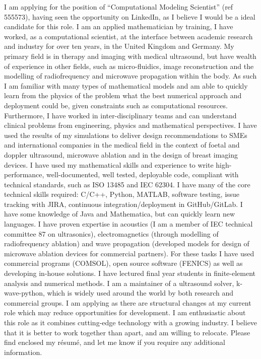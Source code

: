 \documentclass[11pt, a4paper, sans]{moderncv}
\begin{document}
%

%
\vfill
%
I am applying for the position of \enquote{Computational Modeling Scientist} (ref 555573), having seen the opportunity on LinkedIn, as I believe I would be a ideal candidate for this role. 
%
\vfill
%
I am an applied mathematician by training, I have worked, as a computational scientist, at the interface between academic research and industry for over ten years, in the United Kingdom and Germany. My  primary field is in therapy and imaging with medical ultrasound, but have wealth of experience in other fields, such as micro-fluidics, image reconstruction and the modelling of radiofrequency and microwave propagation within the body. As such I am familiar with many types of mathematical models and am able to quickly learn from the physics of the problem what the best numerical approach and deployment could be, given constraints such as computational resources.
%
\vfill
%
Furthermore, I have worked in inter-disciplinary teams and can understand clinical problems from engineering, physics and mathematical perspectives. I have used the results of my simulations to deliver design recommendations to SMEs and international companies in the medical field in the context of foetal and doppler ultrasound, microwave ablation and in the design of breast imaging devices. 
%
\vfill
%
I have used my mathematical skills and experience to write high-performance, well-documented, well tested, deployable code, compliant with technical standards, such as ISO 13485 and IEC 62304. I have many of the core technical skills required: C/C++, Python, MATLAB, software testing, issue tracking with JIRA, continuous integration/deployment in GitHub/GitLab. I have some knowledge of Java and Mathematica, but can quickly learn new languages.
%
\vfill
%
I have proven expertise in acoustics (I am a member of IEC technical committee 87 on ultrasonics), electromagnetics (through modelling of radiofrequency ablation) and wave propagation (developed models for design of microwave ablation devices for commercial partners). For these tasks I have used commercial programs (COMSOL), open source software (FENICS) as well as developing in-house solutions. I have lectured final year students in finite-element analysis and numerical methods. I am a maintainer of a ultrasound solver, k-wave-python, which is widely used around the world by both research and commercial groups. 
%
\vfill
%
I am applying as there are structural changes at my current role which may reduce opportunities for development. I am enthusiastic about this role as it combines cutting-edge technology with a growing industry. I believe that it is better to work together than apart, and am willing to relocate. 
%
\vfill
Please find enclosed my r\'{e}sum\'{e}, and let me know if you require any additional information.
%
\vfill
\makeletterclosing
\vfill
\end{document}
